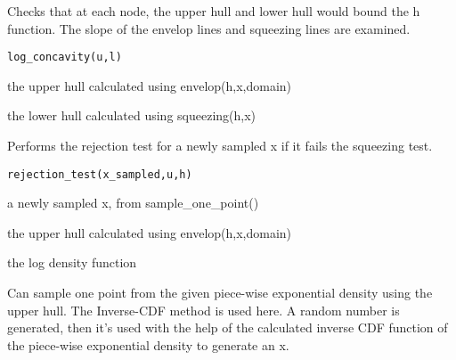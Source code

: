 \documentclass[a4paper]{book}
\begin{document}
%
\begin{Description}\relax
Checks that at each node, the upper hull and lower hull would bound the h function. The slope of the envelop lines and squeezing lines are examined.
\end{Description}
%
\begin{Usage}
\begin{verbatim}
log_concavity(u,l)
\end{verbatim}
\end{Usage}
%
\begin{Arguments}
\begin{ldescription}
\item[\code{u}] the upper hull calculated using envelop(h,x,domain)

\item[\code{l}] the lower hull calculated using squeezing(h,x)
\end{ldescription}
\end{Arguments}
%
\begin{Description}\relax
Performs the rejection test for a newly sampled x if it fails the squeezing test.
\end{Description}
%
\begin{Usage}
\begin{verbatim}
rejection_test(x_sampled,u,h)
\end{verbatim}
\end{Usage}
%
\begin{Arguments}
\begin{ldescription}
\item[\code{x\_sampled}] a newly sampled x, from sample\_one\_point()

\item[\code{u}] the upper hull calculated using envelop(h,x,domain)

\item[\code{h}] the log density function
\end{ldescription}
\end{Arguments}
%
\begin{Description}\relax
Can sample one point from the given piece-wise exponential density using the upper hull. The Inverse-CDF method is used here. A random number is generated, then it's used with the help of the calculated inverse CDF function of the piece-wise exponential density to generate an x.
\end{Description}
\end{document}
